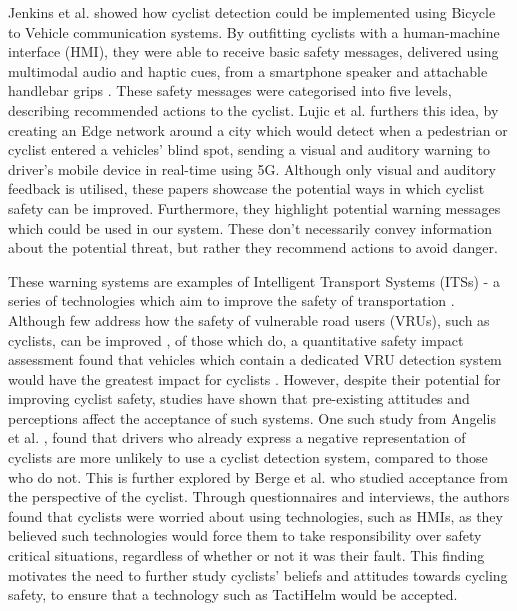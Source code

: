 \documentclass{mpaper}
\begin{document}
Jenkins et al. \cite{7929602} showed how cyclist detection could be implemented using Bicycle to Vehicle communication systems. By outfitting cyclists with a human-machine interface (HMI), they were able to receive basic safety messages, delivered using multimodal audio and haptic cues, from a smartphone speaker and attachable handlebar grips \cite{smartgrips}. These safety messages were categorised into five levels, describing recommended actions to the cyclist. Lujic et al. \cite{10.1145/3434770.3459732} furthers this idea, by creating an Edge network around a city which would detect when a pedestrian or cyclist entered a vehicles' blind spot, sending a visual and auditory warning to driver's mobile device in real-time using 5G. Although only visual and auditory feedback is utilised, these papers showcase the potential ways in which cyclist safety can be improved. Furthermore, they highlight potential warning messages which could be used in our system. These don't necessarily convey information about the potential threat, but rather they recommend actions to avoid danger.

These warning systems are examples of Intelligent Transport Systems (ITSs) - a series of technologies which aim to improve the safety of transportation \cite{its}. Although few address how the safety of vulnerable road users (VRUs), such as cyclists, can be improved \cite{Scholliers2017}, of those which do, a quantitative safety impact assessment found that vehicles which contain a dedicated VRU detection system would have the greatest impact for cyclists \cite{SILLA2017134}. However, despite their potential for improving cyclist safety, studies have shown that pre-existing attitudes and perceptions affect the acceptance of such systems. One such study from Angelis et al. \cite{de2017negative}, found that drivers who already express a negative representation of cyclists are more unlikely to use a cyclist detection system, compared to those who do not. This is further explored by Berge et al. \cite{berge2022cyclists} who studied acceptance from the perspective of the cyclist. Through questionnaires and interviews, the authors found that cyclists were worried about using technologies, such as HMIs, as they believed such technologies would force them to take responsibility over safety critical situations, regardless of whether or not it was their fault. This finding motivates the need to further study cyclists' beliefs and attitudes towards cycling safety, to ensure that a technology such as TactiHelm would be accepted.
\end{document}
